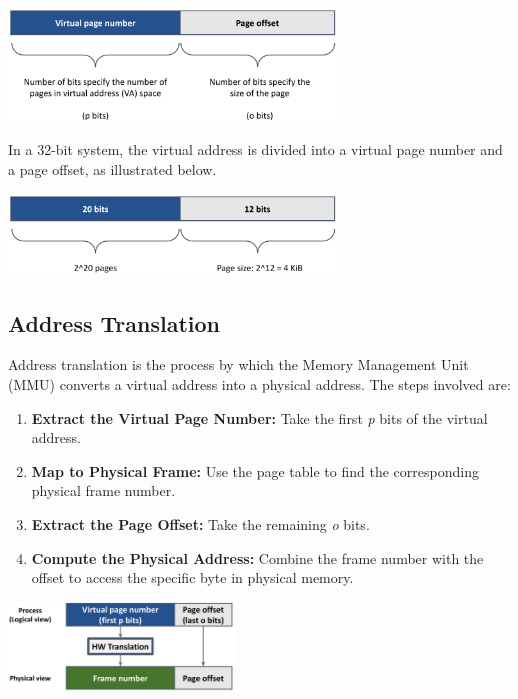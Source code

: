 \documentclass[../../compsys.tex]{subfiles}
\begin{document}
\begin{minipage}{\linewidth}
  \centering
  \includegraphics[width=0.65\textwidth]{chapters/L5/images/virtual.png}
\end{minipage}
\newpage
\begin{example}
In a 32-bit system, the virtual address is divided into a virtual page number and a page offset, as illustrated below.\\
\begin{center}
  \includegraphics[width=0.65\textwidth]{chapters/L5/images/paging-example.png}
\end{center}
\end{example}

\subsection{Address Translation}
Address translation is the process by which the Memory Management Unit (MMU) converts a virtual address into a physical address. The steps involved are:
\begin{enumerate}
  \item \textbf{Extract the Virtual Page Number:} Take the first \textit{p} bits of the virtual address.
  \item \textbf{Map to Physical Frame:} Use the page table to find the corresponding physical frame number.
  \item \textbf{Extract the Page Offset:} Take the remaining \textit{o} bits.
  \item \textbf{Compute the Physical Address:} Combine the frame number with the offset to access the specific byte in physical memory.
\end{enumerate}

\begin{center}
  \includegraphics[width=0.45\textwidth]{chapters/L5/images/translation.png}
\end{center}
\end{document}
